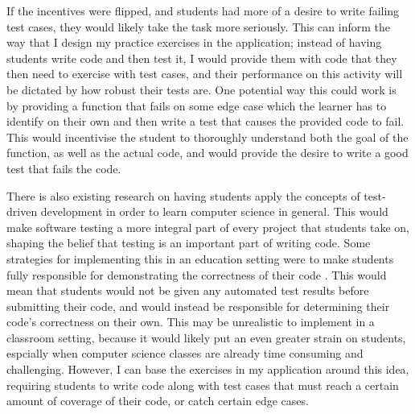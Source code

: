 \documentclass[10pt,twocolumn]{article}
\begin{document}
If the incentives were flipped, and students had 
more of a desire to write failing test cases, they would likely take the task more seriously. This can inform the way 
that I design my practice exercises in the application; instead of having students write code and then test it, I would 
provide them with code that they then need to exercise with test cases, and their performance on this activity will be 
dictated by how robust their tests are. One potential way this could work is by providing a function that fails on some 
edge case which the learner has to identify on their own and then write a test that causes the provided code to fail. 
This would incentivise the student to thoroughly understand both the goal of the function, as well as the actual code, 
and would provide the desire to write a good test that fails the code. 

There is also existing research on having students apply the concepts of test-driven development in order to learn 
computer science in general. This would make software testing a more integral part of every project that students take 
on, shaping the belief that testing is an important part of writing code. Some strategies for implementing this in an 
education setting were to make students fully responsible for demonstrating the correctness of their code 
\cite{Edwards2003Article1}. This would mean that students would not be given any automated test results before 
submitting their code, and would instead be responsible for determining their code's correctness on their own. This may 
be unrealistic to implement in a classroom setting, because it would likely put an even greater strain on students, 
espcially when computer science classes are already time consuming and challenging. However, I can base the exercises in 
my application around this idea, requiring students to write code along with test cases that must reach a certain amount 
of coverage of their code, or catch certain edge cases. 


\end{document}
